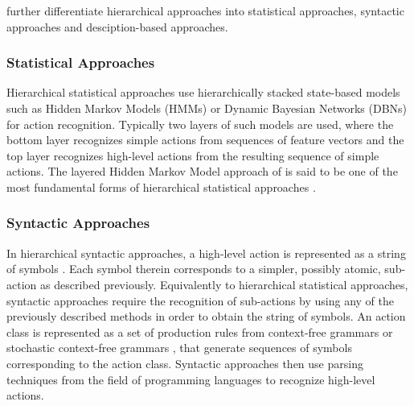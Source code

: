 \textcite{aggarwal_human_2011} further differentiate hierarchical approaches into statistical approaches, syntactic approaches and desciption-based approaches.


\subsubsection{Statistical Approaches} 
Hierarchical statistical approaches use hierarchically stacked state-based models such as Hidden Markov Models (HMMs) \cite{oliver_layered_2002}\cite{zhang_modeling_2004} or Dynamic Bayesian Networks (DBNs) \cite{dai_group_2008}\cite{gong_recognition_2003} for action recognition.
Typically two layers of such models are used, where the bottom layer recognizes simple actions from sequences of feature vectors and the top layer recognizes high-level actions from the resulting sequence of simple actions.
The layered Hidden Markov Model approach of \textcite{oliver_layered_2002} is said to be one of the most fundamental forms of hierarchical statistical approaches \cite{aggarwal_human_2011}.


\subsubsection{Syntactic Approaches} 
In hierarchical syntactic approaches, a high-level action is represented as a string of symbols \cite{cheng_advances_2015}.
Each symbol therein corresponds to a simpler, possibly atomic, sub-action as described previously.
Equivalently to hierarchical statistical approaches, syntactic approaches require the recognition of sub-actions by using any of the previously described methods in order to obtain the string of symbols.
An action class is represented as a set of production rules from context-free grammars or stochastic context-free grammars \cite{ivanov_recognition_2000}\cite{moore_recognizing_2002}\cite{minnen_expectation_2003}\cite{joo_attribute_2006}, that generate sequences of symbols corresponding to the action class.
Syntactic approaches then use parsing techniques from the field of programming languages \cite{hopcroft_introduction_1979} to recognize high-level actions.



